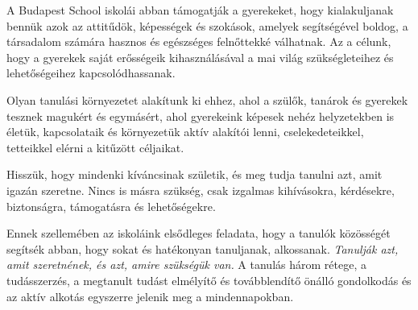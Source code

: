 A Budapest School iskolái abban támogatják a gyerekeket, hogy kialakuljanak bennük azok az attitűdök, képességek és szokások, amelyek segítségével boldog, a társadalom számára hasznos és egészséges felnőttekké válhatnak. Az a célunk, hogy a gyerekek saját erősségeik kihasználásával a mai világ szükségleteihez és lehetőségeihez kapcsolódhassanak.

Olyan tanulási környezetet alakítunk ki ehhez, ahol a szülők, tanárok és gyerekek tesznek magukért és egymásért, ahol gyerekeink képesek nehéz helyzetekben is életük, kapcsolataik és környezetük aktív alakítói lenni, cselekedeteikkel, tetteikkel elérni a kitűzött céljaikat.

Hisszük, hogy mindenki kíváncsinak születik, és meg tudja tanulni azt, amit igazán szeretne. Nincs is másra szükség, csak izgalmas kihívásokra, kérdésekre, biztonságra, támogatásra és lehetőségekre.

Ennek szellemében az iskoláink elsődleges feladata, hogy a tanulók közösségét segítsék abban, hogy sokat és hatékonyan tanuljanak, alkossanak. \emph{Tanulják azt, amit szeretnének, és azt, amire szükségük van.} A tanulás három rétege, a tudásszerzés, a megtanult tudást elmélyítő és továbblendítő önálló gondolkodás és az aktív alkotás egyszerre jelenik meg a mindennapokban.
